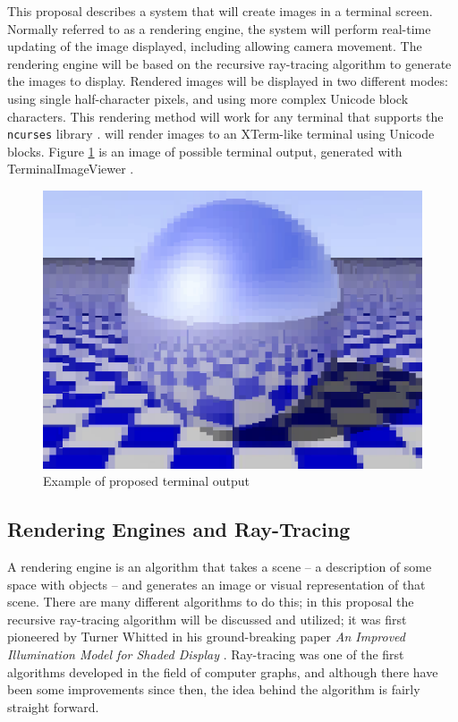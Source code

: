 \documentclass[11pt]{article}
\begin{document}

This proposal describes a system that will create images in a terminal screen. Normally referred to as a rendering engine, the system will perform real-time updating of the image displayed, including allowing camera movement. The rendering engine will be based on the recursive ray-tracing algorithm to generate the images to display. Rendered images will be displayed in two different modes: using single half-character pixels, and using more complex Unicode block characters. This rendering method will work for any terminal that supports the \texttt{ncurses} library \cite{}.
 will render images to an XTerm-like terminal using Unicode blocks. Figure \ref{fig:checker_metal} is an image of possible terminal output, generated with TerminalImageViewer \cite{tivGithub}.


\begin{figure}[htb]
  \label{fig:checker_metal}
  \centering
  \includegraphics[width=\textwidth]{resources/checker_metal}
  \caption{Example of proposed terminal output}
\end{figure}

\subsection{Rendering Engines and Ray-Tracing}

A rendering engine is an algorithm that takes a scene -- a description of some space with objects -- and generates an image or visual representation of that scene.
There are many different algorithms to do this; in this proposal the recursive ray-tracing algorithm will be discussed and utilized; it was first pioneered by Turner Whitted in his ground-breaking paper {\it An Improved Illumination Model for Shaded Display} \cite{whitted1980improved}.
Ray-tracing was one of the first algorithms developed in the field of computer graphs, and although there have been some improvements since then, the idea behind the algorithm is fairly straight forward.
\end{document}
